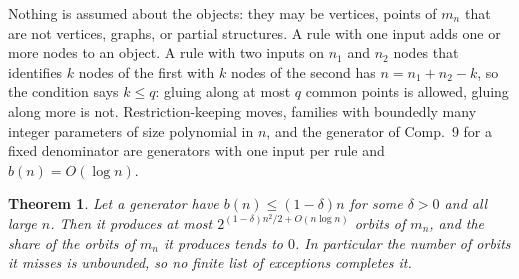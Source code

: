 \documentclass[11pt,a4paper]{article}
\newtheorem{theorem}{Theorem}
\theoremstyle{definition}
\theoremstyle{remark}
\begin{document}
Nothing is assumed about the objects: they may be vertices, points of $m_n$ that are not vertices, graphs, or
partial structures. A rule with one input adds one or more nodes to an object. A rule with two inputs on $n_1$ and
$n_2$ nodes that identifies $k$ nodes of the first with $k$ nodes of the second has $n = n_1 + n_2 - k$, so the
condition says $k \le q$: gluing along at most $q$ common points is allowed, gluing along more is not.
Restriction-keeping moves, families with boundedly many integer parameters of size polynomial in $n$, and the
generator of Comp.~9 for a fixed denominator are generators with one input per rule and $b(n) = O(\log n)$.

\begin{theorem}\label{thm:generator}
Let a generator have $b(n) \le (1 - \delta)n$ for some $\delta > 0$ and all large $n$. Then it produces at most
$2^{(1-\delta)n^2/2 + O(n \log n)}$ orbits of $m_n$, and the share of the orbits of $m_n$ it produces tends to $0$.
In particular the number of orbits it misses is unbounded, so no finite list of exceptions completes it.
\end{theorem}
\end{document}
